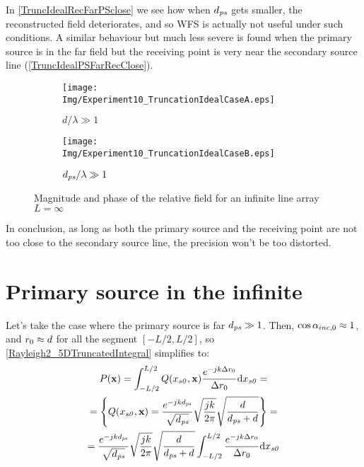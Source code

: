 In \autoref{TruncIdealRecFarPSclose} we see how when $d_{\PosTheoSubInd[primarySource]}$ gets smaller, the reconstructed field deteriorates, and so WFS is actually not useful under such conditions. A similar behaviour but much less severe is found when the primary source is in the far field but the receiving point is very near the secondary source line (\autoref{TruncIdealPSFarRecClose}).
\begin{figure}[h]
	\centering
	\begin{subfigure}[b]{0.49\textwidth}
		\centering
		\texttt{[image: Img/Experiment10\_TruncationIdealCaseA.eps]}
		\caption{$d/\lambda \gg 1$}
		\label{TruncIdealRecFarPSclose}
	\end{subfigure}
	\begin{subfigure}[b]{0.49\textwidth}
		\centering
		\texttt{[image: Img/Experiment10\_TruncationIdealCaseB.eps]}
		\caption{$d_{\PosTheoSubInd[primarySource]}/\lambda \gg 1$}
		\label{TruncIdealPSFarRecClose}
	\end{subfigure}
	\caption{Magnitude and phase of the relative field for an infinite line array $L = \infty$}
\end{figure}
In conclusion, as long as both the primary source and the receiving point are not too close to the secondary source line, the precision won't be too distorted.

\section{Primary source in the infinite}
Let's take the case where the primary source is far $d_{\PosTheoSubInd[primarySource]} \gg 1$. Then, $\cos\alpha_{inc,0} \approx 1$, and $r_0 \approx d$ for all the segment $[-L/2, L/2]$, so \autoref{Rayleigh2_5DTruncatedIntegral} simplifies to:
\begin{multline}
	P(\PosTheo) = \int_{-L/2}^{L/2} Q(x_{\PosTheoSubInd[section]}, \PosTheo) \frac{e^{-jk\distLinePoint}}{\distLinePoint} \mathrm{d}x_{\PosTheoSubInd[section]} =\\
	= \left\{Q(x_{\PosTheoSubInd[section]}, \PosTheo) =  \frac{e^{-jkd_{\PosTheoSubInd[primarySource]}}}{\sqrt{d_{\PosTheoSubInd[primarySource]}}} \sqrt{\frac{j k}{2\pi}} \sqrt{\frac{d}{d_{\PosTheoSubInd[primarySource]} + d}}\right\} = \\
	= \frac{e^{-jkd_{\PosTheoSubInd[primarySource]}}}{\sqrt{d_{\PosTheoSubInd[primarySource]}}} \sqrt{\frac{j k}{2\pi}} \sqrt{\frac{d}{d_{\PosTheoSubInd[primarySource]} + d}} \int_{-L/2}^{L/2} \frac{e^{-jk\distLinePoint}}{\distLinePoint} \mathrm{d}x_{\PosTheoSubInd[section]}
	\label{truncDeductionI}
\end{multline}

